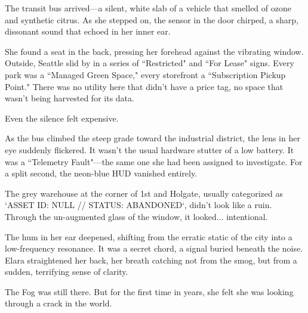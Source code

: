 The transit bus arrived—a silent, white slab of a vehicle that smelled of ozone and synthetic citrus. As she stepped on, the sensor in the door chirped, a sharp, dissonant sound that echoed in her inner ear.


She found a seat in the back, pressing her forehead against the vibrating window. Outside, Seattle slid by in a series of ``Restricted" and ``For Lease" signs. Every park was a ``Managed Green Space," every storefront a ``Subscription Pickup Point." There was no utility here that didn't have a price tag, no space that wasn't being harvested for its data. 

Even the silence felt expensive.

As the bus climbed the steep grade toward the industrial district, the lens in her eye suddenly flickered. It wasn't the usual hardware stutter of a low battery. It was a ``Telemetry Fault"—the same one she had been assigned to investigate. For a split second, the neon-blue HUD vanished entirely. 

The grey warehouse at the corner of 1st and Holgate, usually categorized as `ASSET ID: NULL // STATUS: ABANDONED`, didn't look like a ruin. Through the un-augmented glass of the window, it looked... intentional. 

The hum in her ear deepened, shifting from the erratic static of the city into a low-frequency resonance. It was a secret chord, a signal buried beneath the noise. Elara straightened her back, her breath catching not from the smog, but from a sudden, terrifying sense of clarity. 

The Fog was still there. But for the first time in years, she felt she was looking through a crack in the world.
